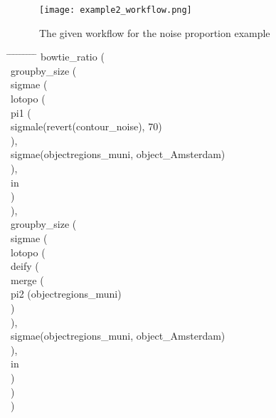 \documentclass{article}
\begin{document}
\begin{sidewaysfigure}
  \centering
    \texttt{[image: example2\_workflow.png]}
    \caption{The given workflow for the noise proportion example }
    \label{figure:noiseProportionworkflow}
\end{sidewaysfigure}
\begin{tabbing}
\hspace{0.5cm}     \= \hspace{0.5cm}  \= \hspace{0.5cm}  \= \hspace{0.5cm}  \=\hspace{0.5cm}  \=\hspace{0.5cm} \= \hspace{0.5cm}  \= \hspace{0.5cm} \= \hspace{0.5cm} \= \hspace{0.5cm}\kill
bowtie\_ratio ( \\
\>groupby\_size ( \\
\>\>sigmae (\\
\>\>\>lotopo (\\ 
\>\>\>\>pi1 (\\
\>\>\>\>\>sigmale(revert(contour\_noise), 70)\\
\>\>\>\>),\\
\>\>\>\>sigmae(objectregions\_muni, object\_Amsterdam)\\
\>\>\>),\\
\>\>\>in\\
\>\>)\\
\>),\\ 
\>groupby\_size (\\
\>\>sigmae (\\
\>\>\>lotopo (\\
\>\>\>\>deify (\\
\>\>\>\>\>merge (\\
\>\>\>\>\>\>pi2 (objectregions\_muni)\\
\>\>\>\>\>)\\
\>\>\>\>),\\
\>\>\>\>sigmae(objectregions\_muni, object\_Amsterdam)\\
\>\>\>),\\
\>\>\>in\\
\>\>)\\
\>)\\
)
\end{tabbing}
\end{document}
